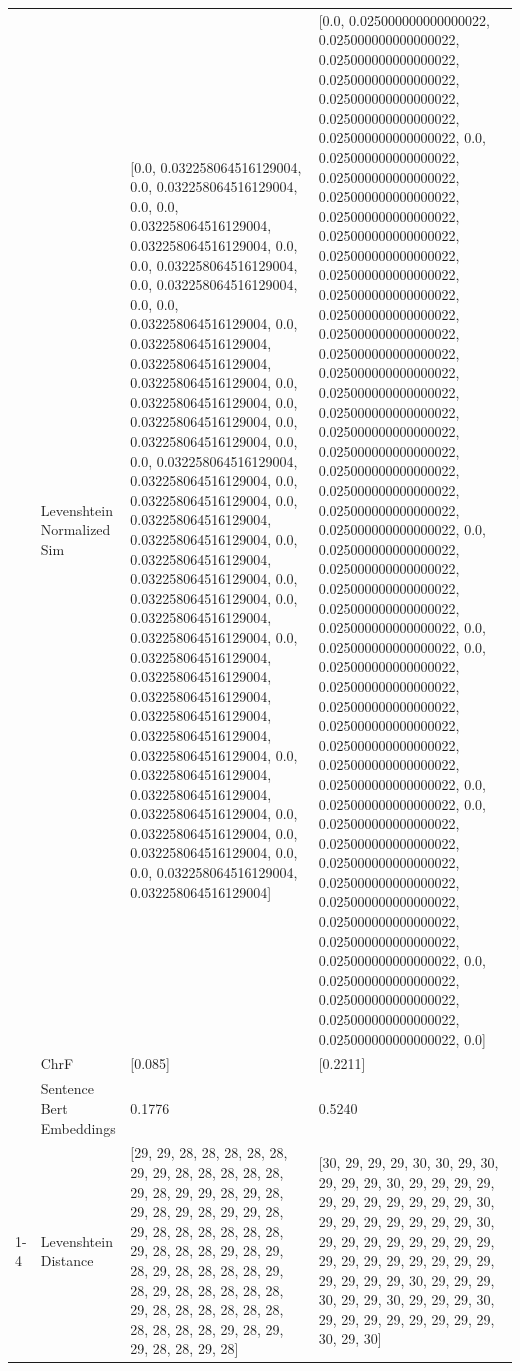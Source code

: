 \begin{tabular}{llll}
 & Levenshtein Normalized Sim & [0.0, 0.032258064516129004, 0.0, 0.032258064516129004, 0.0, 0.0, 0.032258064516129004, 0.032258064516129004, 0.0, 0.0, 0.032258064516129004, 0.0, 0.032258064516129004, 0.0, 0.0, 0.032258064516129004, 0.0, 0.032258064516129004, 0.032258064516129004, 0.032258064516129004, 0.0, 0.032258064516129004, 0.0, 0.032258064516129004, 0.0, 0.032258064516129004, 0.0, 0.0, 0.032258064516129004, 0.032258064516129004, 0.0, 0.032258064516129004, 0.0, 0.032258064516129004, 0.032258064516129004, 0.0, 0.032258064516129004, 0.032258064516129004, 0.0, 0.032258064516129004, 0.0, 0.032258064516129004, 0.032258064516129004, 0.0, 0.032258064516129004, 0.032258064516129004, 0.032258064516129004, 0.032258064516129004, 0.032258064516129004, 0.032258064516129004, 0.0, 0.032258064516129004, 0.032258064516129004, 0.032258064516129004, 0.0, 0.032258064516129004, 0.0, 0.032258064516129004, 0.0, 0.0, 0.032258064516129004, 0.032258064516129004] & [0.0, 0.025000000000000022, 0.025000000000000022, 0.025000000000000022, 0.025000000000000022, 0.025000000000000022, 0.025000000000000022, 0.025000000000000022, 0.0, 0.025000000000000022, 0.025000000000000022, 0.025000000000000022, 0.025000000000000022, 0.025000000000000022, 0.025000000000000022, 0.025000000000000022, 0.025000000000000022, 0.025000000000000022, 0.025000000000000022, 0.025000000000000022, 0.025000000000000022, 0.025000000000000022, 0.025000000000000022, 0.025000000000000022, 0.025000000000000022, 0.025000000000000022, 0.025000000000000022, 0.025000000000000022, 0.025000000000000022, 0.0, 0.025000000000000022, 0.025000000000000022, 0.025000000000000022, 0.025000000000000022, 0.025000000000000022, 0.0, 0.025000000000000022, 0.0, 0.025000000000000022, 0.025000000000000022, 0.025000000000000022, 0.025000000000000022, 0.025000000000000022, 0.025000000000000022, 0.025000000000000022, 0.0, 0.025000000000000022, 0.0, 0.025000000000000022, 0.025000000000000022, 0.025000000000000022, 0.025000000000000022, 0.025000000000000022, 0.025000000000000022, 0.025000000000000022, 0.025000000000000022, 0.0, 0.025000000000000022, 0.025000000000000022, 0.025000000000000022, 0.025000000000000022, 0.0] \\
 & ChrF & [0.085] & [0.2211] \\
 & Sentence Bert Embeddings & 0.1776 & 0.5240 \\
\cline{1-4}
\multirow[t]{4}{*}{Ne ssanja lyaaliko olulagala.} & Levenshtein Distance & [29, 29, 28, 28, 28, 28, 28, 29, 29, 28, 28, 28, 28, 28, 29, 28, 29, 29, 28, 29, 28, 29, 28, 29, 28, 29, 29, 28, 29, 28, 28, 28, 28, 28, 28, 29, 28, 28, 28, 29, 28, 29, 28, 29, 28, 28, 28, 28, 29, 28, 29, 28, 28, 28, 28, 28, 29, 28, 28, 28, 28, 28, 28, 28, 28, 28, 28, 29, 28, 29, 29, 28, 28, 29, 28] & [30, 29, 29, 29, 30, 30, 29, 30, 29, 29, 29, 30, 29, 29, 29, 29, 29, 29, 29, 29, 29, 29, 29, 30, 29, 29, 29, 29, 29, 29, 29, 30, 29, 29, 29, 29, 29, 29, 29, 29, 29, 29, 29, 29, 29, 29, 29, 29, 29, 29, 29, 29, 30, 29, 29, 29, 30, 29, 29, 30, 29, 29, 29, 30, 29, 29, 29, 29, 29, 29, 29, 29, 30, 29, 30] \\

\end{tabular}
